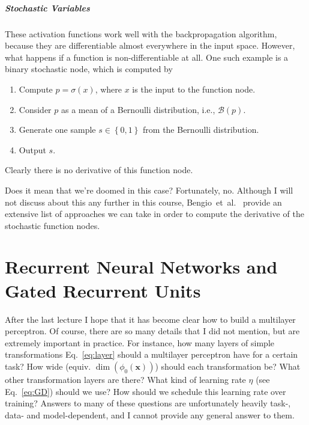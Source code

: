\documentclass{report}
\newcommand{\vect}[1]{\mathbf{#1}}
\newcommand{\vx}[0]{\vect{x}}
\newcommand{\BB}[0]{\mathcal{B}}
\begin{document}
\paragraph{Stochastic Variables}
These activation functions work well with the backpropagation algorithm, because
they are differentiable almost everywhere in the input space. However, what
happens if a function is non-differentiable at all. One such example is a binary
stochastic node, which is computed by
\begin{enumerate}
    \itemsep 0em
    \item Compute $p = \sigma(x)$, where $x$ is the input to the function node.
    \item Consider $p$ as a mean of a Bernoulli distribution, i.e., $\BB(p)$.
    \item Generate one sample $s \in \left\{ 0, 1\right\}$ from the Bernoulli distribution.
    \item Output $s$.
\end{enumerate}
Clearly there is no derivative of this function node. 

Does it mean that we're doomed in this case? Fortunately, no. Although I will
not discuss about this any further in this course,
Bengio~et~al.~\cite{bengio2013estimating} provide an extensive list of
approaches we can take in order to compute the derivative of the stochastic
function nodes.



\chapter{Recurrent Neural Networks and Gated Recurrent Units}
\label{chap:rnn}

After the last lecture I hope that it has become clear how to build a multilayer
perceptron. Of course, there are so many details that I did not mention, but are
extremely important in practice. For instance, how many layers of simple
transformations Eq.~\eqref{eq:layer} should a multilayer perceptron have for a
certain task? How wide (equiv. $\dim(\phi_0(\vx))$) should each transformation
be? What other transformation layers are there? What kind of learning rate
$\eta$ (see Eq.~\eqref{eq:GD}) should we use? How should we schedule this
learning rate over training? Answers to many of these questions are
unfortunately heavily task-, data- and model-dependent, and I cannot provide any
general answer to them.

\end{document}
